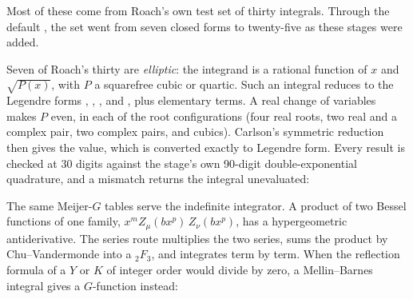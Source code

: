 \begin{codepairs}
\end{codepairs}

Most of these come from Roach's own test set of thirty integrals. Through the default
, the set went from seven closed forms to twenty-five as these stages
were added.

Seven of Roach's thirty are \emph{elliptic}: the integrand is a rational function of
\(x\) and \(\sqrt{P(x)}\), with \(P\) a squarefree cubic or quartic. Such an integral
reduces to the Legendre forms , , , and
, plus elementary terms. A real change
of variables makes \(P\) even, in each of the root configurations (four real roots,
two real and a complex pair, two complex pairs, and cubics). Carlson's symmetric
reduction then gives the value, which is converted exactly to Legendre form. Every
result is checked at 30 digits against the stage's own 90-digit double-exponential
quadrature, and a mismatch returns the integral unevaluated:

\begin{codepairs}
\end{codepairs}

The same Meijer-\(G\) tables serve the indefinite integrator. A product of two
Bessel functions of one family, \(x^m Z_\mu(bx^p)\,Z_\nu(bx^p)\), has a
hypergeometric antiderivative. The series route multiplies the two series, sums the
product by Chu--Vandermonde into a \({}_2F_3\), and integrates term by term. When the
reflection formula of a \(Y\) or \(K\) of integer order would divide by zero, a
Mellin--Barnes integral gives a \(G\)-function instead:

